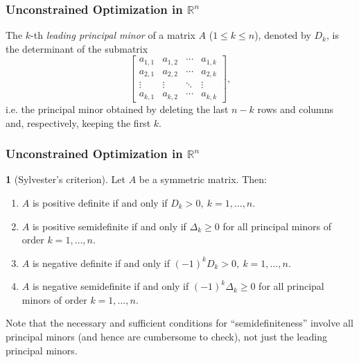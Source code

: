 \documentclass[10pt]{beamer}
\theoremstyle{definition}
\newtheorem{Fact}{\translate{Fact}}
\begin{document}
\begin{frame}[fragile]
\frametitle{Unconstrained Optimization in $ \mathbb{R}^n $}
The $ k $-th \emph{leading principal minor} of a matrix $ A $ ($ 1\leq k \leq n $), denoted by $ D_k $, is the determinant of the submatrix \[  \begin{bmatrix}
a_{1,1} & a_{1,2} & \cdots & a_{1,k}\\
a_{2,1} & a_{2,2} & \cdots & a_{2,k}\\
\vdots&\vdots& \ddots& \vdots\\
a_{k,1} & a_{k,2} & \cdots & a_{k,k}
\end{bmatrix} , \]
i.e. the principal minor obtained by deleting the last $ n-k $ rows and columns and, respectively, keeping the first $ k $.

\end{frame}

\begin{frame}[fragile]
\frametitle{Unconstrained Optimization in $ \mathbb{R}^n $}
\begin{Fact}[Sylvester's criterion]
Let $ A $ be a symmetric matrix. Then:
\begin{enumerate}
\item $ A $ is positive definite if and only if $ D_k >0,~k=1,\ldots,n $.
\item $ A $ is positive semidefinite if and only if $ \Delta_k \geq 0 $ for all principal minors of order $ k = 1,\ldots,n $.
\item $ A $ is negative definite if and only if $ (-1)^k D_k >0,~k=1,\ldots,n $.
\item $ A $ is negative semidefinite if and only if $ (-1)^k \Delta_k \geq 0 $ for all principal minors of order $ k = 1,\ldots,n $.
\end{enumerate}
\label{fc:Sylvester}
\end{Fact}

Note that the necessary and sufficient conditions for ``semidefiniteness'' involve all principal minors (and hence are cumbersome to check), not just the leading principal minors.
\end{frame}
\end{document}
